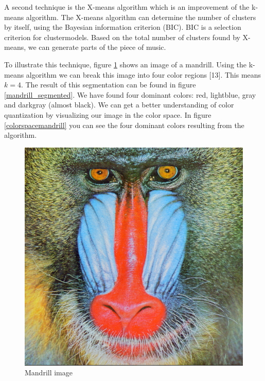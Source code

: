 \documentclass[12pt]{article}
\begin{document}
A second technique is the X-means algorithm which is an improvement of the k-means algorithm. The X-means algorithm can determine the number of clusters by itself, using the Bayesian information criterion (BIC). BIC is a selection criterion for clustermodels. Based on the total number of clusters found by X-means, we can generate parts of the piece of music.
\newline

To illustrate this technique, figure \ref{mandrill} shows an image of a mandrill. Using the k-means algorithm we can break this image into four color regions [13]. This means $k = 4$. The result of this segmentation can be found in figure \ref{mandrill_segmented}. We have found four dominant colors: red, lightblue, gray and darkgray (almost black). We can get a better understanding of color quantization by visualizing our image in the color space. In figure \ref{colorspacemandrill} you can see the four dominant colors resulting from the algorithm.  

\begin{figure}[H]
\centering
\includegraphics[scale = 0.39]{img/mandrill}
\caption{Mandrill image}
\label{mandrill}
\end{figure}
\end{document}
